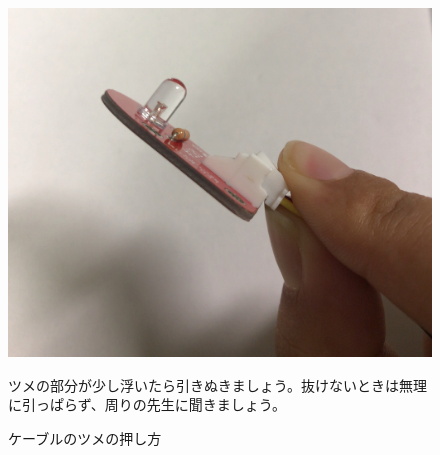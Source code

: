 \begin{enumerate}
\begin{figure}[H]
  \begin{minipage}[t]{0.48\columnwidth}
    \centering
    \includegraphics[width=0.8\hsize]{images/chap05/text05-img011.jpg}
    \caption{ケーブルのツメの押し方}
ツメの部分が少し浮いたら引きぬきましょう。抜けないときは無理に引っぱらず、周りの先生に聞きましょう。
  \end{minipage}
\end{figure}
\end{enumerate}
\begin{tcolorbox}[title=\useOmetoi]
\begin{enumerate}
\end{enumerate}
\end{tcolorbox}















